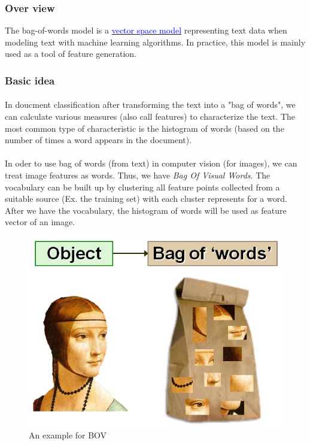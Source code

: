 \subsubsection*{Over view}
The bag-of-words model is a \href{https://en.wikipedia.org/wiki/Vector_space_model}{\textcolor{blue}{vector space model}} representing text data when modeling text with machine learning algorithms. In practice, this model is mainly used as a tool of feature generation.

\subsubsection*{Basic idea}
\paragraph*{}
In doucment classification after transforming the text into a "bag of words", we can calculate various measures (also call features) to characterize the text. The most common type of characteristic is the histogram of words (based on the number of times a word appears in the document).

\paragraph*{}
In oder to use bag of words (from text) in computer vision (for images), we can treat image features as words. Thus, we have \textit{Bag Of Visual Words}. The vocabulary can be built up by clustering all feature points collected from a suitable source (Ex. the training set) with each cluster represents for a word. After we have the vocabulary, the histogram of words will be used as feature vector of an image.

\begin{figure}[h!]
	\centering
	\includegraphics[width=0.6\linewidth]{images/bow/example.jpg}
	\caption[BOV example]{An example for BOV}
\end{figure}

